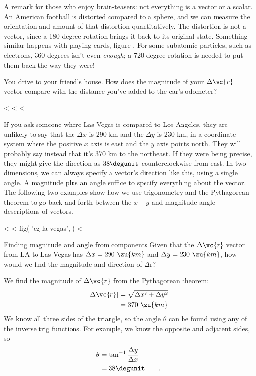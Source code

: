A remark for those who enjoy brain-teasers: not everything is a vector or a scalar.
An American football is distorted compared to
a sphere, and we can measure the orientation and amount of that distortion quantitatively.
The distortion is not a vector, since
a 180-degree rotation brings it back to its original state. Something similar happens with
playing cards, figure . For some subatomic particles, such as electrons, 360 degrees
isn't even \emph{enough}; a 720-degree rotation is needed to put them back the way they were!

\startdqs

\begin{dq}
You drive to your friend's house. How does the magnitude
of your $\Delta\vc{r}$ vector compare with the distance you've
added to the car's odometer?
\end{dq}

<%
<%
<%

If you ask someone where Las Vegas is compared to Los
Angeles, they are unlikely to say that the $\Delta x$ is 290
km and the $\Delta y$ is 230 km, in a coordinate system
where the positive $x$ axis is east and the $y$ axis points
north. They will probably say instead that it's 370 km to
the northeast. If they were being precise, they might
give the direction as $38\degunit$ counterclockwise from east.
In two dimensions, we can always specify a vector's
direction like this, using a single angle. A magnitude plus
an angle suffice to specify everything about the vector. The
following two examples show how we use trigonometry and the
Pythagorean theorem to go back and forth between the $x-y$
and magnitude-angle descriptions of vectors.

<%
<%
  fig(
    'eg-la-vegas',
  )
<%
\begin{eg}{Finding magnitude and angle from components}\label{eg:la-vegas}
\egquestion Given that the $\Delta \vc{r}$ vector from LA to Las
Vegas has $\Delta x=290\ \zu{km}$ and $\Delta y=230\ \zu{km}$, how would
we find the magnitude and direction of $\Delta $r?

\eganswer We find the magnitude of $\Delta \vc{r}$ from the
Pythagorean theorem:
\begin{align*}
        |\Delta \vc{r}|  &= \sqrt{\Delta x^2 + \Delta y^2}   \\
             &=  370\ \zu{km}
\end{align*}
We know all three sides of the triangle, so the angle
$\theta $ can be found using any of the inverse trig
functions. For example, we know the opposite and adjacent sides, so
\begin{align*}
        \theta       &=  \tan^{-1}\frac{\Delta y}{\Delta x}  \\
             &=  38\degunit   \qquad   .
\end{align*}
\end{eg}

